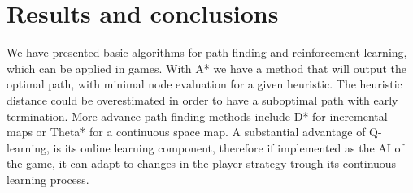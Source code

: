 \documentclass[12pt]{article}
\begin{document}
\section{Results and conclusions}

We have presented basic algorithms for path finding and reinforcement learning, which can be applied in games.
With A* we have a method that will output the optimal path, with minimal node evaluation for a given heuristic.
The heuristic distance could be overestimated in order to have a suboptimal path with early termination.
More advance path finding methods include D*\cite{Stentz1993} for incremental maps or Theta*\cite{Nash2007} for a continuous space map.
A substantial advantage of Q-learning, is its online learning component, therefore if implemented as the AI of the game, it can adapt to changes in the player strategy trough its continuous learning process.



\end{document}
